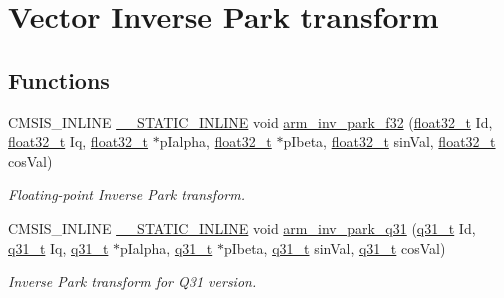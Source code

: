 \hypertarget{group__inv__park}{}\section{Vector Inverse Park transform}
\label{group__inv__park}
\subsection*{Functions}
\begin{DoxyCompactItemize}
\item 
C\+M\+S\+I\+S\+\_\+\+I\+N\+L\+I\+NE \mbox{\hyperlink{cmsis__iccarm_8h_aba87361bfad2ae52cfe2f40c1a1dbf9c}{\+\_\+\+\_\+\+S\+T\+A\+T\+I\+C\+\_\+\+I\+N\+L\+I\+NE}} void \mbox{\hyperlink{group__inv__park_ga7ca3a87a0954ed8c9ed5a2e6f1c64f30}{arm\+\_\+inv\+\_\+park\+\_\+f32}} (\mbox{\hyperlink{arm__math_8h_a4611b605e45ab401f02cab15c5e38715}{float32\+\_\+t}} Id, \mbox{\hyperlink{arm__math_8h_a4611b605e45ab401f02cab15c5e38715}{float32\+\_\+t}} Iq, \mbox{\hyperlink{arm__math_8h_a4611b605e45ab401f02cab15c5e38715}{float32\+\_\+t}} $\ast$p\+Ialpha, \mbox{\hyperlink{arm__math_8h_a4611b605e45ab401f02cab15c5e38715}{float32\+\_\+t}} $\ast$p\+Ibeta, \mbox{\hyperlink{arm__math_8h_a4611b605e45ab401f02cab15c5e38715}{float32\+\_\+t}} sin\+Val, \mbox{\hyperlink{arm__math_8h_a4611b605e45ab401f02cab15c5e38715}{float32\+\_\+t}} cos\+Val)
\begin{DoxyCompactList}\small\item\em Floating-\/point Inverse Park transform. \end{DoxyCompactList}\item 
C\+M\+S\+I\+S\+\_\+\+I\+N\+L\+I\+NE \mbox{\hyperlink{cmsis__iccarm_8h_aba87361bfad2ae52cfe2f40c1a1dbf9c}{\+\_\+\+\_\+\+S\+T\+A\+T\+I\+C\+\_\+\+I\+N\+L\+I\+NE}} void \mbox{\hyperlink{group__inv__park_ga6e00d7320aa4a85686716af8b763e08a}{arm\+\_\+inv\+\_\+park\+\_\+q31}} (\mbox{\hyperlink{arm__math_8h_adc89a3547f5324b7b3b95adec3806bc0}{q31\+\_\+t}} Id, \mbox{\hyperlink{arm__math_8h_adc89a3547f5324b7b3b95adec3806bc0}{q31\+\_\+t}} Iq, \mbox{\hyperlink{arm__math_8h_adc89a3547f5324b7b3b95adec3806bc0}{q31\+\_\+t}} $\ast$p\+Ialpha, \mbox{\hyperlink{arm__math_8h_adc89a3547f5324b7b3b95adec3806bc0}{q31\+\_\+t}} $\ast$p\+Ibeta, \mbox{\hyperlink{arm__math_8h_adc89a3547f5324b7b3b95adec3806bc0}{q31\+\_\+t}} sin\+Val, \mbox{\hyperlink{arm__math_8h_adc89a3547f5324b7b3b95adec3806bc0}{q31\+\_\+t}} cos\+Val)
\begin{DoxyCompactList}\small\item\em Inverse Park transform for Q31 version. \end{DoxyCompactList}\end{DoxyCompactItemize}



